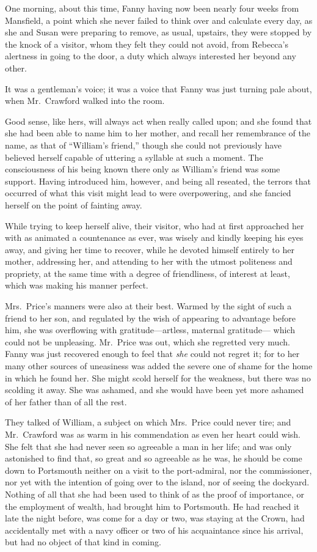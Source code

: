 One morning, about this time, Fanny having now been nearly
four weeks from Mansfield, a point which she never failed
to think over and calculate every day, as she and Susan
were preparing to remove, as usual, upstairs, they were
stopped by the knock of a visitor, whom they felt they could
not avoid, from Rebecca's alertness in going to the door,
a duty which always interested her beyond any other.

It was a gentleman's voice; it was a voice that Fanny
was just turning pale about, when Mr.\ Crawford walked
into the room.

Good sense, like hers, will always act when really
called upon; and she found that she had been able to name
him to her mother, and recall her remembrance of the name,
as that of ``William's friend,'' though she could not
previously have believed herself capable of uttering a
syllable at such a moment.  The consciousness of his being
known there only as William's friend was some support.
Having introduced him, however, and being all reseated,
the terrors that occurred of what this visit might lead
to were overpowering, and she fancied herself on the point
of fainting away.

While trying to keep herself alive, their visitor, who had
at first approached her with as animated a countenance
as ever, was wisely and kindly keeping his eyes away,
and giving her time to recover, while he devoted himself
entirely to her mother, addressing her, and attending to
her with the utmost politeness and propriety, at the same
time with a degree of friendliness, of interest at least,
which was making his manner perfect.

Mrs.\ Price's manners were also at their best.  Warmed by
the sight of such a friend to her son, and regulated
by the wish of appearing to advantage before him, she was
overflowing with gratitude---artless, maternal gratitude---%
which could not be unpleasing.  Mr.\ Price was out,
which she regretted very much.  Fanny was just recovered
enough to feel that \emph{she} could not regret it; for to her
many other sources of uneasiness was added the severe
one of shame for the home in which he found her.
She might scold herself for the weakness, but there was
no scolding it away.  She was ashamed, and she would have
been yet more ashamed of her father than of all the rest.

They talked of William, a subject on which Mrs.\ Price
could never tire; and Mr.\ Crawford was as warm in his
commendation as even her heart could wish.  She felt
that she had never seen so agreeable a man in her life;
and was only astonished to find that, so great and so
agreeable as he was, he should be come down to Portsmouth
neither on a visit to the port-admiral, nor the commissioner,
nor yet with the intention of going over to the island,
nor of seeing the dockyard.  Nothing of all that she
had been used to think of as the proof of importance,
or the employment of wealth, had brought him to Portsmouth.
He had reached it late the night before, was come for a
day or two, was staying at the Crown, had accidentally
met with a navy officer or two of his acquaintance since
his arrival, but had no object of that kind in coming.

